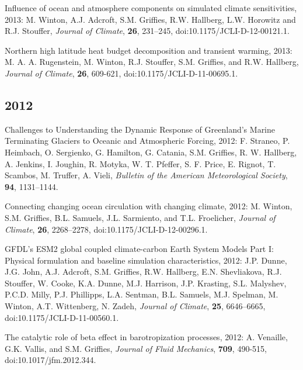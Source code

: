 \begin{etaremune}
\item Influence of ocean and atmosphere components on simulated climate sensitivities, 2013: M. Winton, A.J. Adcroft, S.M. Grif\/f\/ies, R.W. Hallberg, L.W. Horowitz and R.J. Stouffer, {\it Journal of Climate}, {\bf 26}, 231--245,  doi:10.1175/JCLI-D-12-00121.1.

\item Northern high latitude heat budget decomposition and transient warming, 2013: M. A. A. Rugenstein, M. Winton, R.J. Stouffer, S.M. Grif\/f\/ies, and R.W. Hallberg, {\it Journal of Climate}, {\bf 26}, 609-621, doi:10.1175/JCLI-D-11-00695.1.


\subsection*{\sc \color{Maroon} 2012}

\item Challenges to Understanding the Dynamic Response of Greenland's Marine Terminating Glaciers to Oceanic and Atmospheric Forcing, 2012: F. Straneo, P. Heimbach, O. Sergienko, G. Hamilton, G. Catania, S.M. Grif\/f\/ies, R. W. Hallberg, A. Jenkins, I. Joughin, R. Motyka, W. T. Pfeffer, S. F. Price, E. Rignot, T. Scambos, M. Truffer, A. Vieli, {\it Bulletin of the American Meteorological Society}, {\bf 94}, 1131--1144.

\item Connecting changing ocean circulation with changing climate, 2012: M. Winton, S.M. Grif\/f\/ies, B.L. Samuels, J.L. Sarmiento, and T.L. Froelicher, {\it Journal of Climate}, {\bf 26}, 2268--2278, doi:10.1175/JCLI-D-12-00296.1.

\item GFDL’s ESM2 global coupled climate-carbon Earth System Models Part I: Physical formulation and baseline simulation  characteristics, 2012: J.P. Dunne, J.G. John, A.J. Adcroft, S.M. Grif\/f\/ies, R.W. Hallberg, E.N. Shevliakova, R.J. Stouffer,
  W. Cooke, K.A. Dunne, M.J. Harrison, J.P. Krasting, S.L. Malyshev, P.C.D. Milly, P.J. Phillipps, L.A. Sentman, B.L. Samuels,  M.J. Spelman, M. Winton, A.T. Wittenberg, N. Zadeh, {\it Journal of Climate}, {\bf 25}, 6646--6665, doi:10.1175/JCLI-D-11-00560.1.

\item The catalytic role of beta effect in barotropization processes,  2012: A. Venaille, G.K. Vallis, and S.M. Grif\/f\/ies, {\it  Journal of Fluid Mechanics}, {\bf 709}, 490-515, doi:10.1017/jfm.2012.344.


\end{etaremune}
